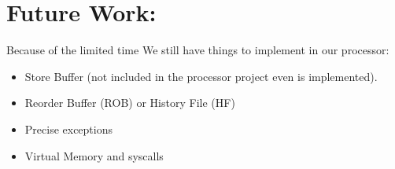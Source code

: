 \documentclass{article}
\begin{document}
\section{Future Work:}
Because of the limited time We still have things to implement in our processor:
\begin{itemize}
\item Store Buffer (not included in the processor project even is implemented).
\item Reorder Buffer (ROB) or History File (HF)
\item Precise exceptions
\item Virtual Memory and syscalls
\end{itemize}
\end{document}
